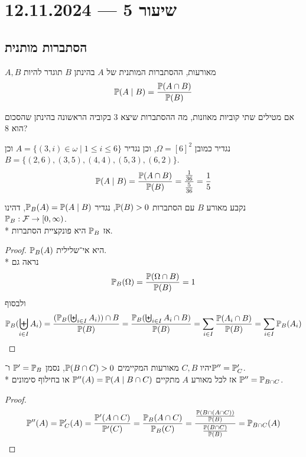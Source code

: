 \section{שיעור 5 --- 12.11.2024}

\subsection{הסתברות מותנית}
\begin{definition}
	$A, B$ מאורעות, ההסתברות המותנית של $A$ בהינתן $B$ תוגדר להיות
	\[
		\mathbb{P}(A \mid B) = \frac{\mathbb{P}(A \cap B)}{\mathbb{P}(B)}
	\]
\end{definition}
\begin{example}
	אם מטילים שתי קוביות מאוזנות, מה ההסתברות שיצא 3 בקוביה הראשונה בהינתן שהסכום הוא 8?

	נגדיר כמובן $\Omega = {[6]}^2$, וכן נגדיר $A = \{ (3, i) \in \omega \mid 1 \le i \le 6 \}$ וכן $B = \{ (2, 6), (3, 5), (4, 4), (5, 3), (6, 2) \}$.
	\[
		\mathbb{P}(A \mid B) = \frac{\mathbb{P}(A \cap B)}{\mathbb{P}(B)}
		= \frac{\frac{1}{36}}{\frac{5}{36}}
		= \frac{1}{5}
	\]
\end{example}
\begin{proposition}
	נקבע מאורע $B$ עם הסתברות $\mathbb{P}(B) > 0$, נגדיר $\mathbb{P}_B(A) = \mathbb{P}(A \mid B)$, דהינו $\mathbb{P}_B : \mathcal{F} \to [0, \infty)$. \\*
	אז $\mathbb{P}_B$ היא פונקציית הסתברות.
\end{proposition}
\begin{proof}
	$\mathbb{P}_B(A)$ היא אי־שלילית. \\*
	נראה גם
	\[
		\mathbb{P}_B(\Omega) = \frac{\mathbb{P}(\Omega \cap B)}{\mathbb{P}(B)} = 1
	\]
	ולבסוף
	\[
		\mathbb{P}_B(\biguplus_{i \in I} A_i)
		= \frac{(\mathbb{P}_B(\biguplus_{i \in I} A_i )) \cap B}{\mathbb{P}(B)}
		= \frac{\mathbb{P}_B(\biguplus_{i \in I} A_i \cap B)}{\mathbb{P}(B)}
		= \sum_{i \in I} \frac{\mathbb{P}(A_i \cap B)}{\mathbb{P}(B)}
		= \sum_{i \in I} \mathbb{P}_B(A_i)
	\]
\end{proof}
\begin{proposition}
	יהיו $C, B$ מאורעות המקיימים $\mathbb{P}(B \cap C) > 0$, נסמן $\mathbb{P}' = \mathbb{P}_B$ ו־$\mathbb{P}'' = \mathbb{P}_C'$. \\*
	אז לכל מאורע $A$ מתקיים $\mathbb{P}''(A) = \mathbb{P}(A \mid B \cap C)$ או בחילוף סימונים $\mathbb{P}'' = \mathbb{P}_{B \cap C}$.
\end{proposition}
\begin{proof}
	\[
		\mathbb{P}''(A)
		= \mathbb{P}_C'(A)
		= \frac{\mathbb{P}'(A \cap C)}{\mathbb{P}'(C)}
		= \frac{\mathbb{P}_B(A \cap C)}{\mathbb{P}_B(C)}
		= \frac{\frac{\mathbb{P}(B \cap (A \cap C))}{\mathbb{P}(B)}}{\frac{\mathbb{P}(B \cap C)}{\mathbb{P}(B)}}
		= \mathbb{P}_{B \cap C}(A)
	\]
\end{proof}
